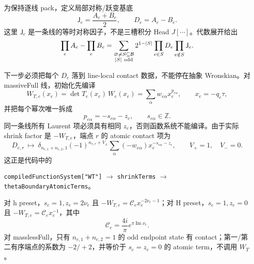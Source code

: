 ﻿\documentclass[a4paper,11pt]{article}
\begin{document}
为保持逐线 pack，定义局部对称/跃变基底
\begin{equation}
 \mathsf J_e=\frac{A_e+B_e}{2},\qquad D_e=A_e-B_e.
 \label{bundleJDDefinition}
\end{equation}
这里 $\mathsf J_e$ 是一条线的等时对称因子，不是三槽积分 Head $J[\cdots]$。代数展开给出
\begin{equation}
 \prod_eA_e-\prod_eB_e
 =\sum_{\substack{\varnothing\ne S\subseteq\mathcal B\\ |S|\ {\rm odd}}}
 2^{1-|S|}\prod_{e\in S}D_e\prod_{e\notin S}\mathsf J_e.
 \label{commonThetaOddSubset}
\end{equation}

下一步必须把每个 $D_e$ 落到 line-local contact 数据，不能停在抽象 Wronskian。对 massiveFull 线，初始化先编译
\begin{equation}
 W_{T,e}(x_e)=\det T_e(x_e)\,W_e(x_e)
 =\sum_{\alpha}w_{e\alpha}x_e^{p_{e\alpha}},
 \qquad x_e=-q_e\tau,
 \label{WTLaurentContact}
\end{equation}
并把每个幂次唯一拆成
\begin{equation}
 p_{e\alpha}=-s_{e\alpha}-z_e,
 \qquad s_{e\alpha}\in\mathbb Z.
 \label{WTShiftSplit}
\end{equation}
同一条线所有 Laurent 项必须具有相同 $z_e$，否则函数系统不能编译。由于实际 shrink factor 是 $-W_{T,e}$，端点 $r$ 的 atomic contact 项为
\begin{equation}
 D_{e,r}\ \longmapsto\
 \delta_{n_{e,1}+n_{e,2},1}
 (-1)^{n_{e,r}+V_\pm}
 \sum_\alpha(-w_{e\alpha})x_e^{-s_{e\alpha}-z_e},
 \qquad V_+=1,\quad V_-=0.
 \label{massiveDToWT}
\end{equation}
这正是代码中的
\begin{center}
\texttt{compiledFunctionSystem["WT"]}
$\longrightarrow$
\texttt{shrinkTerms}
$\longrightarrow$
\texttt{thetaBoundaryAtomicTerms}。
\end{center}
对 h preset，$s_e=1,z_e=2\nu_e$ 且 $-W_{T,e}=\mathcal C_ex_e^{-2\nu_e-1}$；对 H preset，$s_e=1,z_e=0$ 且 $-W_{T,e}=\mathcal C_ex_e^{-1}$，其中
\begin{equation}
 \mathcal C_e=\frac{4i}{\pi}e^{\pi\operatorname{Im}\nu_e}.
\end{equation}
对 masslessFull，只有 $n_{e,1}+n_{e,2}=1$ 的 odd endpoint state 有 contact；第一/第二有序端点的系数为 $-2/+2$，并等价于 $s_e=z_e=0$ 的 atomic term，不调用 $W_T$。
\end{document}

